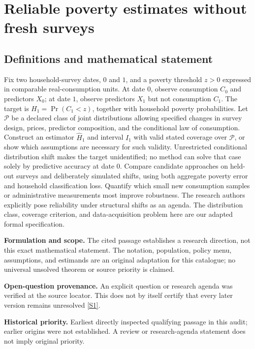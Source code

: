 \documentclass[11pt]{article}
\newcommand{\sref}[2]{\hyperlink{source:#1:#2}{[S#2]}}
\begin{document}
\section*{Reliable poverty estimates without fresh surveys}\label{30007661}
\subsection{Definitions and mathematical statement}
Fix two household-survey dates, \(0\) and \(1\), and a poverty threshold \(z>0\) expressed in comparable real-consumption units. At date \(0\), observe consumption \(C_0\) and predictors \(X_0\); at date \(1\), observe predictors \(X_1\) but not consumption \(C_1\). The target is \(H_1=\Pr(C_1<z)\), together with household poverty probabilities. Let \(\mathcal P\) be a declared class of joint distributions allowing specified changes in survey design, prices, predictor composition, and the conditional law of consumption. Construct an estimator \(\widehat H_1\) and interval \(I_1\) with valid stated coverage over \(\mathcal P\), or show which assumptions are necessary for such validity. Unrestricted conditional distribution shift makes the target unidentified; no method can solve that case solely by predictive accuracy at date \(0\). Compare candidate approaches on held-out surveys and deliberately simulated shifts, using both aggregate poverty error and household classification loss. Quantify which small new consumption samples or administrative measurements most improve robustness. The research authors explicitly pose reliability under structural shifts as an agenda. The distribution class, coverage criterion, and data-acquisition problem here are our adapted formal specification.

\par\textbf{Formulation and scope.} The cited passage establishes a research direction, not this exact mathematical statement. The notation, population, policy menu, assumptions, and estimands are an original adaptation for this catalogue; no universal unsolved theorem or source priority is claimed.

\par\textbf{Open-question provenance.} An explicit question or research agenda was verified at the source locator. This does not by itself certify that every later version remains unresolved \sref{30007661}{1}.

\par\textbf{Historical priority.} Earliest directly inspected qualifying passage in this audit; earlier origins were not established. A review or research-agenda statement does not imply original priority.
\end{document}
